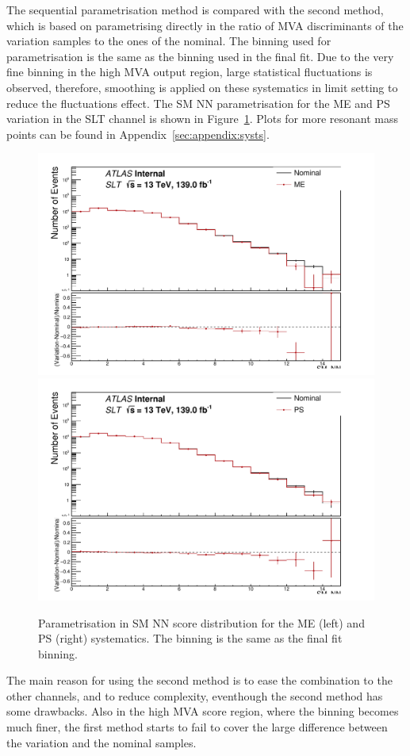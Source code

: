 The sequential parametrisation method is compared with
the second method, which is based on  
parametrising directly in the ratio of MVA discriminants of the variation samples to the 
ones of the nominal. 
The binning used for parametrisation is the same as the binning used in the final fit. 
Due to the very fine binning in the high MVA output region, 
large statistical fluctuations is observed, therefore,
smoothing is applied on these systematics in limit setting to reduce the fluctuations effect. 
The SM NN parametrisation for the ME and PS variation in the SLT channel is shown in 
Figure~\ref{fig:ttbarsyst_lephad_SLT_NN}.
Plots for more resonant mass points can be found in Appendix~\ref{sec:appendix:systs}.

\begin{figure}
\centering
\includegraphics[width=.49\textwidth]{figures/lephad_modelling_systs/SLT/ME/limit_binning_SM_NN_Norm}
\includegraphics[width=.49\textwidth]{figures/lephad_modelling_systs/SLT/PS/limit_binning_SM_NN_Norm}\\
\caption{Parametrisation in SM NN score distribution for the ME (left) and PS (right) systematics.
The binning is the same as the final fit binning.}
\label{fig:ttbarsyst_lephad_SLT_NN}
\end{figure}


The main reason for using the second method is to ease the combination to
the other channels, and to reduce complexity, eventhough the second method has some drawbacks. 
Also in the high MVA score region,
where the binning becomes much finer, the first method starts to fail to cover 
the large difference between the variation and the nominal samples.



